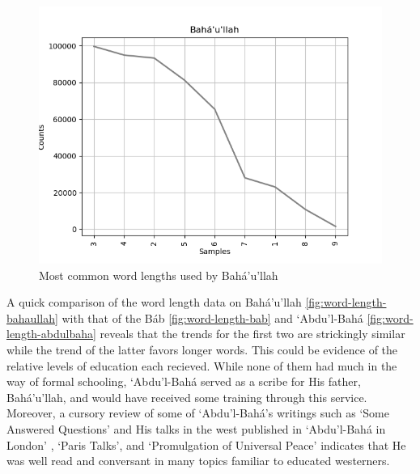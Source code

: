 \documentclass[12pt, oneside]{report}
\begin{document}
\begin{figure}[htb]
	\centering
	\includegraphics[width=15cm]{figures/word-length-bahaullah.png}
	\caption[Most common word lengths used by Bah\'{a}'u'llah]{Most common word lengths used by Bah\'{a}'u'llah}
	\label{fig:word-length-bahaullah}
\end{figure}
A quick comparison of the word length data on Bah\'{a}'u'llah \autoref{fig:word-length-bahaullah} with that of the B\'{a}b \autoref{fig:word-length-bab} and `Abdu'l-Bah\'{a} \autoref{fig:word-length-abdulbaha} reveals that the trends for the first two are strickingly similar while the trend of the latter favors longer words. This could be evidence of the relative levels of education each recieved. While none of them had much in the way of formal schooling, `Abdu'l-Bah\'{a} served as a scribe for His father, Bah\'{a}'u'llah, and would have received some training through this service. Moreover, a cursory review of some of `Abdu'l-Bah\'{a}'s writings such as `Some Answered Questions' and His talks in the west published in `Abdu'l-Bah\'{a} in London' \cite{abdul-baha_abdul-baha_1982}, `Paris Talks'\cite{abdul-baha_paris_nodate}, and `Promulgation of Universal Peace' \cite{abdul-baha_promulgation_1982} indicates that He was well read and conversant in many topics familiar to educated westerners.
\end{document}

